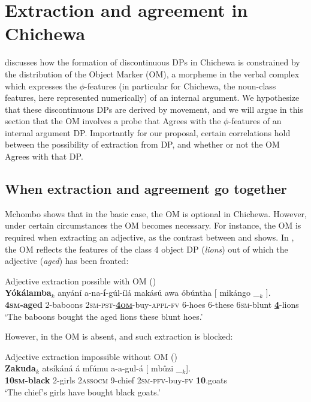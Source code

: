 \documentclass[output=paper,colorlinks,citecolor=brown]{langscibook}
\begin{document}
\section{Extraction and agreement in Chichewa}\label{sec:branan:3}

\citet{Mchombo2004, Mchombo2006} discusses how the formation of discontinuous DPs in Chichewa is constrained by the distribution of the Object Marker (OM), a morpheme in the verbal complex which expresses the $\phi$-features (in particular for Chichewa, the noun-class features, here represented numerically) of an internal argument. We hypothesize that these discontinuous DPs are derived by movement, and we will argue in this section that the OM involves a probe that Agrees with the $\phi$-features of an internal argument DP. Importantly for our proposal, certain correlations hold between the possibility of extraction from DP, and whether or not the OM Agrees with that DP.

\subsection{When extraction and agreement go together}\label{sec:branan:3.1}

Mchombo shows that in the basic case, the OM is optional in Chichewa. However, under certain circumstances the OM becomes necessary. For instance, the OM is required when extracting an adjective, as the contrast between  and  shows. In , the OM reflects the features of the class 4 object DP (\textit{lions}) out of which the adjective (\textit{aged}) has been fronted:

\ea%
    \label{ex:branan:5}
    Adjective extraction possible with OM \hfill{(\citealt[ex. 21b]{Mchombo2004})}\\
    \gll    \textbf{Y\'{o}k\'{a}lamba}$_{k}$ any\'{a}n\'{i} a-na-\textbf{\'{i}}-g\'{u}l-\'{i}l\'{a} mak\'{a}s\'{u} awa \'{o}b\'{u}ntha [ mik\'{a}ngo  \_$_{k}$ ].   \\
             \textbf{4\textsc{sm}-aged} 2-baboons 2\textsc{sm-pst}-\underline{\textbf{4\textsc{om}}}-buy-\textsc{appl-fv} 6-hoes 6-these 6\textsc{sm}-blunt {}  \underline{\textbf{4}}-lions \\
    \glt    `The baboons  bought the aged lions these blunt hoes.'
\z

However, in  the OM is absent, and such extraction is blocked:

\ea%
    \label{ex:branan:6}
    Adjective extraction impossible without OM  \hfill{(\citealt[ex. 4a]{Mchombo2006})}\\
    \gll    *\textbf{Zakuda}$_{k}$ ats\'{i}k\'{a}n\'{a} \'{a} mf\'{u}mu a-a-gul-\'{a} [ mb\^{u}zi   \_$_{k}$].   \\
            \hphantom{*}\textbf{10\textsc{sm}-black} 2-girls 2\textsc{assocm} 9-chief 2\textsc{sm-pfv}-buy-\textsc{fv} {} \textbf{10}.goats {} \\
    \glt    `The chief's girls have bought black goats.'
\z
\end{document}
